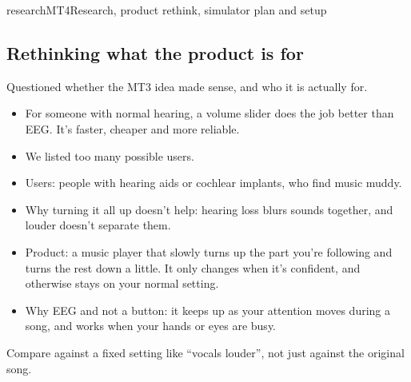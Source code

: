 \begin{entry}{research}{MT4}{Research, product rethink, simulator plan and setup}
\subsection*{Rethinking what the product is for}
Questioned whether the MT3 idea made sense, and who it is actually for.
\begin{itemize}
  \item For someone with normal hearing, a volume slider does the job better than EEG. It's faster, cheaper and more reliable.
  \item We listed too many possible users.
\end{itemize}
\begin{itemize}
  \item Users: people with hearing aids or cochlear implants, who find music muddy.
  \item Why turning it all up doesn't help: hearing loss blurs sounds together, and louder doesn't separate them.
  \item Product: a music player that slowly turns up the part you're following and turns the rest down a little. It only changes when it's confident, and otherwise stays on your normal setting.
  \item Why EEG and not a button: it keeps up as your attention moves during a song, and works when your hands or eyes are busy.
\end{itemize}
Compare against a fixed setting like ``vocals louder'', not just against the original song.


\end{entry}

